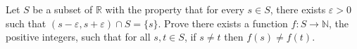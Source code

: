 Let $S$ be a subset of $\mathbb{R}$ with the property that for every $s \in S$,
there exists $\varepsilon > 0$ such that $(s - \varepsilon, s + \varepsilon)
\cap S = \lbrace s \rbrace$. Prove there exists a function $f : S \to
\mathbb{N}$, the positive integers, such that for all $s, t \in S$, if $s \ne
t$ then $f(s) \ne f(t)$.
